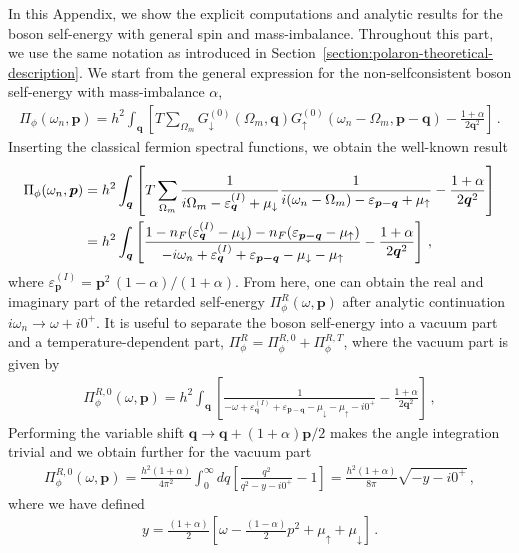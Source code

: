 In this Appendix, we show the explicit computations and analytic results for the boson self-energy with general spin and mass-imbalance. Throughout this part, we use the same notation as introduced in Section~\ref{section:polaron-theoretical-description}. We start from the general expression for the non-selfconsistent boson self-energy with mass-imbalance $\alpha$,
\begin{align}
	\Pi_{\phi}(\omega_n, \bm{p}) =
	h^2 \int_{\bm{q}} \left[ T\sum_{\Omega_m}
	G^{(0)}_{\downarrow}(\Omega_m, \bm{q})
	G^{(0)}_{\uparrow}(\omega_n-\Omega_m, \bm{p-q}) - \frac{1+\alpha}{2\bm{q}^2} \right] \,.
\end{align}
Inserting the classical fermion spectral functions, we obtain the well-known result
\begin{align}
	\Pi_{\phi}(\omega_n, \bm{p}) &= h^2 \int_{\bm{q}} \left[ T\sum_{\Omega_m}
	\frac{1}{i\Omega_m-\varepsilon^{(I)}_{\bm{q}}+\mu_{\downarrow}}
	\frac{1}{i(\omega_n-\Omega_m)-\varepsilon_{\bm{p-q}}+\mu_{\uparrow}} - \frac{1+\alpha}{2\bm{q}^2} \right] \notag \\
	&= h^2 \int_{\bm{q}} \left[ \frac{1-n_F(\varepsilon^{(I)}_{\bm{q}}-\mu_{\downarrow}) -  n_F(\varepsilon_{\bm{p-q}}-\mu_{\uparrow})}{-i\omega_n+\varepsilon^{(I)}_{\bm{q}}+\varepsilon_{\bm{p-q}}-\mu_{\downarrow}-\mu_{\uparrow}} - \frac{1+\alpha}{2\bm{q}^2} \right] \,,
\end{align}
where $\varepsilon^{(I)}_{\bm{p}}=\bm{p}^2\,(1-\alpha)/(1+\alpha)$. From here, one can obtain the real and imaginary part of the retarded self-energy $\Pi_{\phi}^R(\omega,\bm{p})$ after analytic continuation $i\omega_n\rightarrow\omega+i0^+$. It is useful to separate the boson self-energy into a vacuum part and a temperature-dependent part, $\Pi^{R}_{\phi} = \Pi^{R,0}_{\phi} + \Pi^{R,T}_{\phi}$, where the vacuum part is given by
\begin{align}
	\Pi^{R,0}_{\phi}(\omega, \bm{p}) =
	h^2 \int_{\bm{q}} \left[ \frac{1}{-\omega+\varepsilon^{(I)}_{\bm{q}}+\varepsilon_{\bm{p-q}}-\mu_{\downarrow}-\mu_{\uparrow}-i0^+} - \frac{1+\alpha}{2\bm{q}^2} \right] \,,
\end{align}
Performing the variable shift $\bm{q} \rightarrow \bm{q} + (1+\alpha)\bm{p}/2$ makes the angle integration trivial and we obtain further for the vacuum part
\begin{align}
	\Pi^{R,0}_{\phi}(\omega, \bm{p}) =
	\frac{h^2(1+\alpha)}{4\pi^2} \int_0^{\infty} dq \left[\frac{q^2}{q^2-y-i0^+}-1\right]
	= \frac{h^2(1+\alpha)}{8\pi} \sqrt{-y-i0^+} \,,
\end{align}
where we have defined
\begin{align}
	y = \frac{(1+\alpha)}{2}
	\left[\omega-\frac{(1-\alpha)}{2}p^2
	+\mu_{\uparrow}+\mu_{\downarrow}\right] \,.
\end{align}

